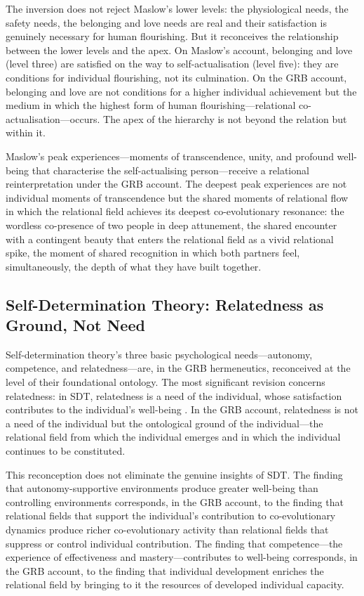 The inversion does not reject Maslow's lower levels: the physiological needs, the safety needs, the belonging and love needs are real and their satisfaction is genuinely necessary for human flourishing. But it reconceives the relationship between the lower levels and the apex. On Maslow's account, belonging and love (level three) are satisfied on the way to self-actualisation (level five): they are conditions for individual flourishing, not its culmination. On the GRB account, belonging and love are not conditions for a higher individual achievement but the medium in which the highest form of human flourishing---relational co-actualisation---occurs. The apex of the hierarchy is not beyond the relation but within it.

Maslow's peak experiences---moments of transcendence, unity, and profound well-being that characterise the self-actualising person---receive a relational reinterpretation under the GRB account. The deepest peak experiences are not individual moments of transcendence but the shared moments of relational flow in which the relational field achieves its deepest co-evolutionary resonance: the wordless co-presence of two people in deep attunement, the shared encounter with a contingent beauty that enters the relational field as a vivid relational spike, the moment of shared recognition in which both partners feel, simultaneously, the depth of what they have built together.

\subsection{Self-Determination Theory: Relatedness as Ground, Not Need}
\label{p14:subsec:sdt-grb}

\noindent
Self-determination theory's three basic psychological needs---autonomy, competence, and relatedness---are, in the GRB hermeneutics, reconceived at the level of their foundational ontology. The most significant revision concerns relatedness: in SDT, relatedness is a need of the individual, whose satisfaction contributes to the individual's well-being \parencite{deci1985}. In the GRB account, relatedness is not a need of the individual but the ontological ground of the individual---the relational field from which the individual emerges and in which the individual continues to be constituted.

This reconception does not eliminate the genuine insights of SDT. The finding that autonomy-supportive environments produce greater well-being than controlling environments corresponds, in the GRB account, to the finding that relational fields that support the individual's contribution to co-evolutionary dynamics produce richer co-evolutionary activity than relational fields that suppress or control individual contribution. The finding that competence---the experience of effectiveness and mastery---contributes to well-being corresponds, in the GRB account, to the finding that individual development enriches the relational field by bringing to it the resources of developed individual capacity.

